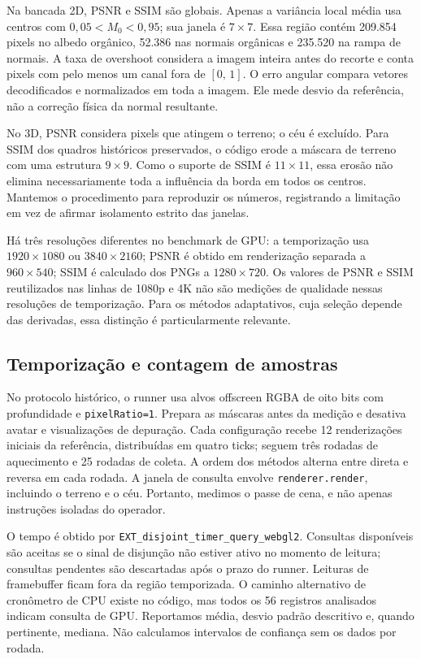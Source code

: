 Na bancada 2D, PSNR e SSIM são globais. Apenas a variância local média usa centros com $0{,}05<M_0<0{,}95$; sua janela é $7\times7$. Essa região contém 209.854 pixels no albedo orgânico, 52.386 nas normais orgânicas e 235.520 na rampa de normais. A taxa de overshoot considera a imagem inteira antes do recorte e conta pixels com pelo menos um canal fora de $[0,\,1]$. O erro angular compara vetores decodificados e normalizados em toda a imagem. Ele mede desvio da referência, não a correção física da normal resultante.

No 3D, PSNR considera pixels que atingem o terreno; o céu é excluído. Para SSIM dos quadros históricos preservados, o código erode a máscara de terreno com uma estrutura $9\times9$. Como o suporte de SSIM é $11\times11$, essa erosão não elimina necessariamente toda a influência da borda em todos os centros. Mantemos o procedimento para reproduzir os números, registrando a limitação em vez de afirmar isolamento estrito das janelas.

Há três resoluções diferentes no benchmark de GPU: a temporização usa $1920\times1080$ ou $3840\times2160$; PSNR é obtido em renderização separada a $960\times540$; SSIM é calculado dos PNGs a $1280\times720$. Os valores de PSNR e SSIM reutilizados nas linhas de 1080p e 4K não são medições de qualidade nessas resoluções de temporização. Para os métodos adaptativos, cuja seleção depende das derivadas, essa distinção é particularmente relevante.

\subsection{Temporização e contagem de amostras}
No protocolo histórico, o runner usa alvos offscreen RGBA de oito bits com profundidade e \texttt{pixelRatio=1}. Prepara as máscaras antes da medição e desativa avatar e visualizações de depuração. Cada configuração recebe 12 renderizações iniciais da referência, distribuídas em quatro ticks; seguem três rodadas de aquecimento e 25 rodadas de coleta. A ordem dos métodos alterna entre direta e reversa em cada rodada. A janela de consulta envolve \texttt{renderer.render}, incluindo o terreno e o céu. Portanto, medimos o passe de cena, e não apenas instruções isoladas do operador.

O tempo é obtido por \texttt{EXT\_disjoint\_timer\_query\_webgl2}. Consultas disponíveis são aceitas se o sinal de disjunção não estiver ativo no momento de leitura; consultas pendentes são descartadas após o prazo do runner. Leituras de framebuffer ficam fora da região temporizada. O caminho alternativo de cronômetro de CPU existe no código, mas todos os 56 registros analisados indicam consulta de GPU. Reportamos média, desvio padrão descritivo e, quando pertinente, mediana. Não calculamos intervalos de confiança sem os dados por rodada.

